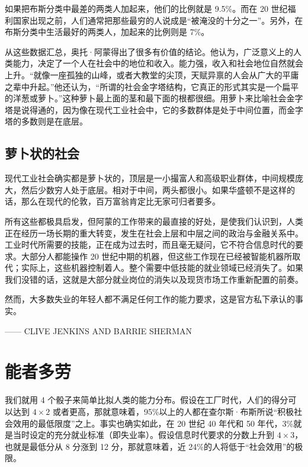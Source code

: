 如果把布斯分类中最差的两类人加起来，他们的比例就是 9.5\%。而在 20 世纪福利国家出现之前，人们通常把那些最穷的人说成是“被淹没的十分之一”。另外，在布斯分类中生活最好的两类人，加起来的比例则是 7\%。

从这些数据汇总，奥托·阿蒙得出了很多有价值的结论。他认为，广泛意义上的人类能力，决定了一个人在社会中的地位和收入。能力强，收入和社会地位自然就会上升。“就像一座孤独的山峰，或者大教堂的尖顶，天赋异禀的人会从广大的平庸之辈中升起。”他还认为，“所谓的社会金字塔结构，它真正的形式其实是一个扁平的洋葱或萝卜。”这种萝卜最上面的茎和最下面的根都很细。用萝卜来比喻社会金字塔是说得通的，因为像在现代工业社会中，它的多数群体是处于中间位置，而金字塔的多数则是在底层。

\subsection{萝卜状的社会}
现代工业社会确实都是萝卜状的，顶层是一小撮富人和高级职业群体，中间规模庞大，然后少数穷人处于底层。相对于中间，两头都很小。如果华盛顿不是这样的话，那么在现代的伦敦，百万富翁肯定比无家可归者要多。

所有这些都极具启发，但阿蒙的工作带来的最直接的好处，是使我们认识到，人类正在经历一场长期的重大转变，发生在社会上层和中层之间的政治与金融关系中。工业时代所需要的技能，正在成为过去时，而且毫无疑问，它不符合信息时代的要求。大部分人都能操作 20 世纪中期的机器，但这些工作现在已经被智能机器所取代；实际上，这些机器控制着人。整个需要中低技能的就业领域已经消失了。如果我们没错的话，这就是大部分就业岗位的消失以及现货市场工作重新配置的前奏。


\begin{tcolorbox}
然而，大多数失业的年轻人都不满足任何工作的能力要求，这是官方私下承认的事实。
\begin{flushright}
—— CLIVE JENKINS AND BARRIE SHERMAN
\end{flushright}
\end{tcolorbox}

\section{能者多劳}
我们就用 4 个骰子来简单比拟人类的能力分布。假设在工厂时代，人们的得分可以达到 $ 4 \times 2 $ 或者更高，那就意味着，95\%以上的人都在查尔斯·布斯所说“积极社会效用的最低限度”之上。事实也确实如此，在 20 世纪 40 年代和 50 年代，3\%就是当时设定的充分就业标准（即失业率）。假设信息时代要求的分数上升到 $ 4 \times 3 $，也就是最低分从 8 分涨到 12 分，那就意味着，近 24\%的人将低于“社会效用”的极限。

